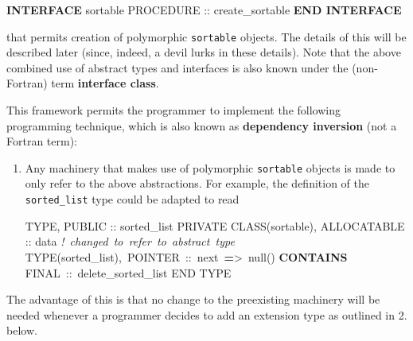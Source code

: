 \documentclass[]{scrartcl}
\newenvironment{Shaded}{}{}
\newcommand{\CommentTok}[1]{\textcolor[rgb]{0.38,0.63,0.69}{\textit{#1}}}
\newcommand{\DataTypeTok}[1]{\textcolor[rgb]{0.56,0.13,0.00}{#1}}
\newcommand{\KeywordTok}[1]{\textcolor[rgb]{0.00,0.44,0.13}{\textbf{#1}}}
\newcommand{\NormalTok}[1]{#1}
\newcommand{\OperatorTok}[1]{\textcolor[rgb]{0.40,0.40,0.40}{#1}}
\begin{document}
\begin{Shaded}
\begin{Highlighting}[]
\KeywordTok{INTERFACE}\NormalTok{ sortable}
   \DataTypeTok{PROCEDURE} \DataTypeTok{::}\NormalTok{ create\_sortable}
\KeywordTok{END INTERFACE}
\end{Highlighting}
\end{Shaded}

that permits creation of polymorphic \texttt{sortable} objects. The
details of this will be described later (since, indeed, a devil lurks in
these details). Note that the above combined use of abstract types and
interfaces is also known under the (non-Fortran) term \textbf{interface
class}.

This framework permits the programmer to implement the following
programming technique, which is also known as \textbf{dependency
inversion} (not a Fortran term):

\begin{enumerate}
\def\labelenumi{\arabic{enumi}.}
\item
  Any machinery that makes use of polymorphic \texttt{sortable} objects
  is made to only refer to the above abstractions. For example, the
  definition of the \texttt{sorted\_list} type could be adapted to read

\begin{Shaded}
\begin{Highlighting}[]
\DataTypeTok{TYPE}\NormalTok{, }\DataTypeTok{PUBLIC} \DataTypeTok{::}\NormalTok{ sorted\_list}
   \DataTypeTok{PRIVATE}
   \DataTypeTok{CLASS(sortable)}\NormalTok{, }\DataTypeTok{ALLOCATABLE} \DataTypeTok{::}\NormalTok{ data}
   \CommentTok{! changed to refer to abstract type}
   \DataTypeTok{TYPE(sorted\_list)}\NormalTok{, POINTER }\DataTypeTok{::}\NormalTok{ next }\KeywordTok{=}\OperatorTok{\textgreater{}}\NormalTok{ null()}
\KeywordTok{CONTAINS}
\NormalTok{   FINAL }\DataTypeTok{::}\NormalTok{ delete\_sorted\_list}
\DataTypeTok{END TYPE}
\end{Highlighting}
\end{Shaded}
\end{enumerate}

The advantage of this is that no change to the preexisting machinery
will be needed whenever a programmer decides to add an extension type as
outlined in 2. below.
\end{document}
